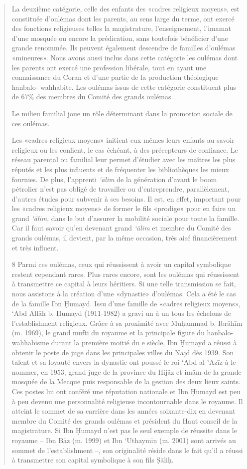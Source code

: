 \begin{quote}
La deuxième catégorie, celle des enfants des «cadres religieux
moyens», est constituée d'oulémas dont les parents, au sens large du
terme, ont exercé des fonctions religieuses telles la magistrature,
l'enseignement, l'imamat d'une mosquée ou encore la prédication, sans
toutefois bénéficier d'une grande renommée. Ils peuvent également
descendre de familles d'oulémas «mineures». Nous avons aussi inclus dans
cette catégorie les oulémas dont les parents ont exercé une profession
libérale, tout en ayant une connaissance du Coran et d'une partie de la
production théologique hanbalo-
wahhabite. Les oulémas issus de cette catégorie constituent plus de 67\%
des membres du Comité des grands oulémas.

Le milieu familial joue un rôle déterminant dans la promotion sociale
de ces oulémas.

Les «cadres religieux moyens» initient eux-mêmes leurs enfants au savoir
religieux ou les confient, le cas échéant, à des précepteurs de
confiance. Le réseau parental ou familial leur permet d'étudier avec les
maîtres les plus réputés et les plus influents et de fréquenter les
bibliothèques les mieux fournies. De plus, l'apprenti \emph{`ālim} de la
génération d'avant le boom pétrolier n'est pas obligé de travailler ou
d'entreprendre, parallèlement, d'autres études pour subvenir à ses
besoins. Il est, en effet, important pour les «cadres religieux moyens»
de former le fils «prodige» pour en faire un grand \emph{`ālim}, dans le
but d'assurer la mobilité sociale pour toute la famille. Car il faut
savoir qu'en devenant grand \emph{`ālim} et membre du Comité des grands
oulémas, il devient, par la même occasion, très aisé financièrement et
très influent.

8 Parmi ces oulémas, ceux qui réussissent à avoir un capital symbolique
restent cependant rares. Plus rares encore, sont les oulémas qui
réussissent à transmettre ce capital à leurs héritiers. Si une telle
transmission se fait, nous assistons à la création d'une «dynastie»
d'oulémas. Cela a été le cas de la famille Ibn Ḥumayd. Issu d'une
famille de «cadres religieux moyens», `Abd Allāh b. Ḥumayd (1911-1982) a
gravi un à un tous les échelons de l'establishment religieux. Grâce à sa
proximité avec Muḥammad b. Ibrāhīm (m. 1969), le grand mufti du royaume
et la principale figure du hanbalo- wahhabisme durant la première moitié
du e siècle, Ibn Ḥumayd a réussi à obtenir le poste de juge dans les
principales villes du Najd dès 1939. Son talent et sa loyauté envers la
dynastie ont poussé le roi `Abd al-‛Azīz à le nommer, en 1953, grand
juge de la province du Hijâz et imâm de la grande mosquée de la Mecque
puis responsable de la gestion des deux lieux saints. Ces postes lui ont
conféré une réputation nationale et Ibn Ḥumayd est peu à peu devenu une
personnalité religieuse incontournable dans le royaume. Il atteint le
sommet de sa carrière dans les années soixante-dix en devenant membre du
Comité des grands oulémas et président du Haut conseil de la
magistrature. Si Ibn Ḥumayd n'est pas le seul exemple de réussite dans
le royaume -- Ibn Bāz (m. 1999) et Ibn `Uthaymīn (m. 2001) sont arrivés
au sommet de l'establishment --, son originalité réside dans le fait
qu'il a réussi à transmettre son capital symbolique à son fils Ṣāliḥ.



\end{quote}
